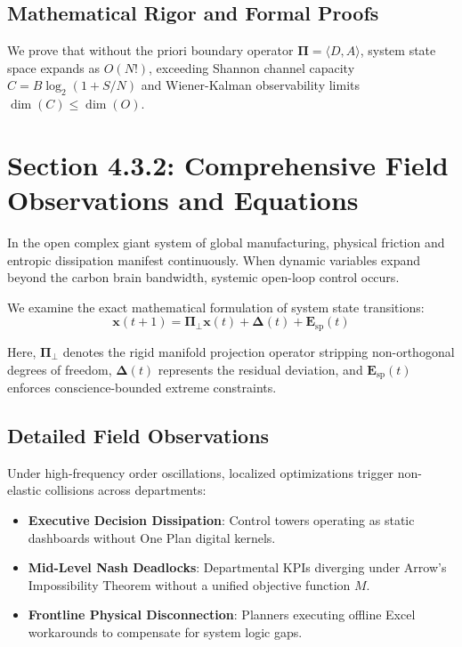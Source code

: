 \documentclass[12pt,a4paper,oneside]{book}
\begin{document}
\subsection*{Mathematical Rigor and Formal Proofs}
We prove that without the priori boundary operator $\mathbf{\Pi} = \langle D, A \rangle$, system state space expands as $O(N!)$, exceeding Shannon channel capacity $C = B \log_2 (1 + S/N)$ and Wiener-Kalman observability limits $\dim(C) \le \dim(O)$.
\clearpage
\section{Section 4.3.2: Comprehensive Field Observations and Equations}

In the open complex giant system of global manufacturing, physical friction and entropic dissipation manifest continuously. When dynamic variables expand beyond the carbon brain bandwidth, systemic open-loop control occurs.

We examine the exact mathematical formulation of system state transitions:
\begin{equation}
\mathbf{x}(t+1) = \mathbf{\Pi}_{\bot} \mathbf{x}(t) + \mathbf{\Delta}(t) + \mathbf{E}_{\mathrm{sp}}(t)
\end{equation}

Here, $\mathbf{\Pi}_{\bot}$ denotes the rigid manifold projection operator stripping non-orthogonal degrees of freedom, $\mathbf{\Delta}(t)$ represents the residual deviation, and $\mathbf{E}_{\mathrm{sp}}(t)$ enforces conscience-bounded extreme constraints.

\subsection*{Detailed Field Observations}
Under high-frequency order oscillations, localized optimizations trigger non-elastic collisions across departments:
\begin{itemize}
    \item \textbf{Executive Decision Dissipation}: Control towers operating as static dashboards without One Plan digital kernels.
    \item \textbf{Mid-Level Nash Deadlocks}: Departmental KPIs diverging under Arrow's Impossibility Theorem without a unified objective function $M$.
    \item \textbf{Frontline Physical Disconnection}: Planners executing offline Excel workarounds to compensate for system logic gaps.
\end{itemize}
\end{document}

